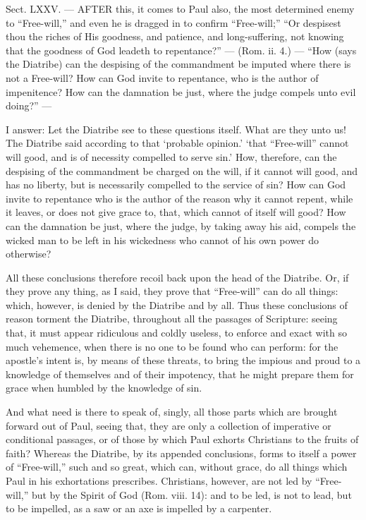 
Sect. LXXV. — AFTER this, it comes to Paul also, the most determined enemy to “Free-will,” and even he is dragged in to confirm “Free-will;” “Or despisest thou the riches of His goodness, and patience, and long-suffering, not knowing that the goodness of God leadeth to repentance?” — (Rom. ii. 4.) — “How (says the Diatribe) can the despising of the commandment be imputed where there is not a Free-will? How can God invite to repentance, who is the author of impenitence? How can the damnation be just, where the judge compels unto evil doing?” —

I answer: Let the Diatribe see to these questions itself. What are they unto us! The Diatribe said according to that ‘probable opinion.’ ‘that “Free-will” cannot will good, and is of necessity compelled to serve sin.’ How, therefore, can the despising of the commandment be charged on the will, if it cannot will good, and has no liberty, but is necessarily compelled to the service of sin? How can God invite to repentance who is the author of the reason why it cannot repent, while it leaves, or does not give grace to, that, which cannot of itself will good? How can the damnation be just, where the judge, by taking away his aid, compels the wicked man to be left in his wickedness who cannot of his own power do otherwise?

All these conclusions therefore recoil back upon the head of the Diatribe. Or, if they prove any thing, as I said, they prove that “Free-will” can do all things: which, however, is denied by the Diatribe and by all. Thus these conclusions of reason torment the Diatribe, throughout all the passages of Scripture: seeing that, it must appear ridiculous and coldly useless, to enforce and exact with so much vehemence, when there is no one to be found who can perform: for the apostle’s intent is, by means of these threats, to bring the impious and proud to a knowledge of themselves and of their impotency, that he might prepare them for grace when humbled by the knowledge of sin.

And what need is there to speak of, singly, all those parts which are brought forward out of Paul, seeing that, they are only a collection of imperative or conditional passages, or of those by which Paul exhorts Christians to the fruits of faith? Whereas the Diatribe, by its appended conclusions, forms to itself a power of “Free-will,” such and so great, which can, without grace, do all things which Paul in his exhortations prescribes. Christians, however, are not led by “Free-will,” but by the Spirit of God (Rom. viii. 14): and to be led, is not to lead, but to be impelled, as a saw or an axe is impelled by a carpenter.

